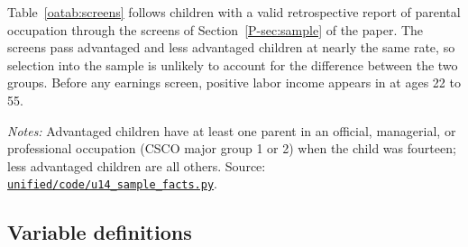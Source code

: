 \documentclass[11pt]{article}
\numberwithin{equation}{section}
\newcommand{\repourl}{https://github.com/JiachenJin1001/family-background-earnings-china}
\newcommand{\code}[1]{\href{\repourl/blob/main/#1}{\nolinkurl{#1}}}
\begin{document}
Table~\ref{oatab:screens} follows children with a valid retrospective
report of parental occupation through the screens of
Section~\ref{P-sec:sample} of the paper. The screens pass advantaged
and less advantaged children at nearly the same rate, so selection into the sample is unlikely to account for the difference between the two groups. Before
any earnings screen, positive labor income appears in
 at ages 22 to 55.

\begin{table}[H]
\centering
\small
\caption{Sample screens by family background.}
\label{oatab:screens}
\setlength{\tabcolsep}{4pt}

\par\smallskip
\begin{minipage}{0.92\textwidth}
\footnotesize\emph{Notes:} Advantaged children have at least one
parent in an official, managerial, or professional occupation (CSCO
major group 1 or 2) when the child was fourteen; less advantaged children are
all others. Source: \code{unified/code/u14_sample_facts.py}.
\end{minipage}
\end{table}

\subsection{Variable definitions}
\end{document}
